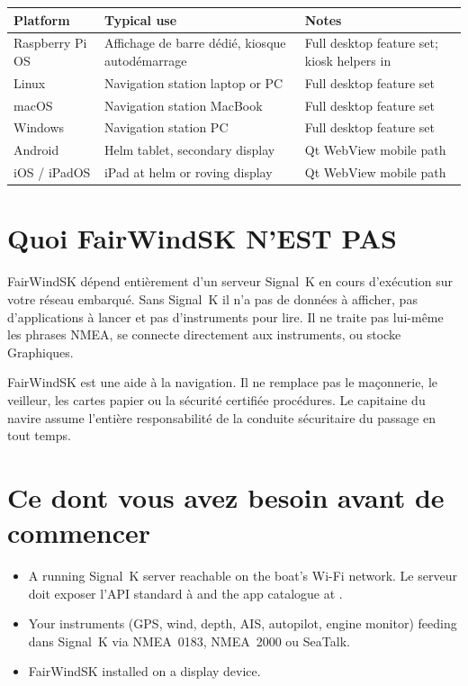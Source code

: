 \begin{longtable}{L{3.0cm}L{4.8cm}L{5.9cm}}
\toprule
{}
\color{white}\sffamily\bfseries Platform &
\color{white}\sffamily\bfseries Typical use &
\color{white}\sffamily\bfseries Notes \\
\midrule
Raspberry Pi OS&Affichage de barre dédié, kiosque autodémarrage&
  Full desktop feature set; kiosk helpers in  \\
Linux           & Navigation station laptop or PC    & Full desktop feature set \\
macOS           & Navigation station MacBook         & Full desktop feature set \\
Windows         & Navigation station PC              & Full desktop feature set \\
Android         & Helm tablet, secondary display     & Qt WebView mobile path \\
iOS / iPadOS    & iPad at helm or roving display     & Qt WebView mobile path \\
\bottomrule
\end{longtable}

\section{Quoi FairWindSK N'EST PAS}

FairWindSK dépend entièrement d'un serveur Signal~K en cours d'exécution sur votre réseau embarqué.
Sans Signal~K il n'a pas de données à afficher, pas d'applications à lancer et pas d'instruments
pour lire.
Il ne traite pas lui-même les phrases NMEA, se connecte directement aux instruments, ou stocke
Graphiques.

\begin{warningbox}
FairWindSK est une aide à la navigation.
Il ne remplace pas le maçonnerie, le veilleur, les cartes papier ou la sécurité certifiée
procédures.
Le capitaine du navire assume l'entière responsabilité de la conduite sécuritaire du passage
en tout temps.
\end{warningbox}

\section{Ce dont vous avez besoin avant de commencer}

\begin{itemize}
  \item A running Signal~K server reachable on the boat's Wi-Fi network.
Le serveur doit exposer l'API standard à
         and the app catalogue at
        .
  \item Your instruments (GPS, wind, depth, AIS, autopilot, engine monitor) feeding
dans Signal~K via NMEA~0183, NMEA~2000 ou SeaTalk.
  \item FairWindSK installed on a display device.
\end{itemize}

